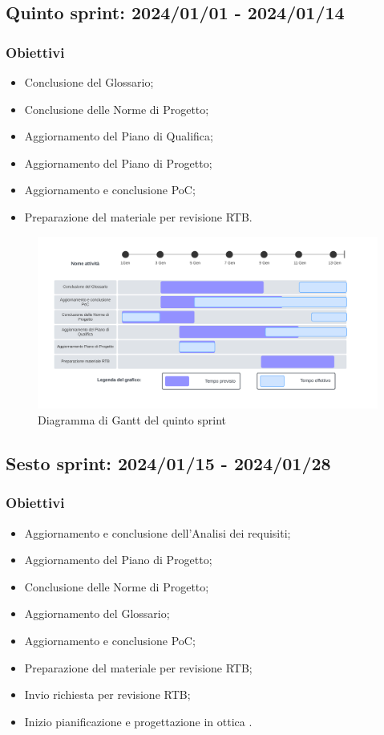\subsection{Quinto sprint: 2024/01/01 - 2024/01/14}
\subsubsection{Obiettivi}
\begin{itemize}
    \item Conclusione del Glossario;
    \item Conclusione delle Norme di Progetto;
    \item Aggiornamento del Piano di Qualifica;
    \item Aggiornamento del Piano di Progetto;
    \item Aggiornamento e conclusione PoC;
    \item Preparazione del materiale per revisione RTB.
\end{itemize}

\begin{figure}[h!]
    \centering  
    \includegraphics[width=\textwidth]{Roadmap5sprint.png}
    \caption{Diagramma di Gantt del quinto sprint}
    \label{fig:roadmap5s}
\end{figure}
\newpage

\subsection{Sesto sprint: 2024/01/15 - 2024/01/28}
\subsubsection{Obiettivi}
\begin{itemize}
    \item Aggiornamento e conclusione dell'Analisi dei requisiti;
    \item Aggiornamento del Piano di Progetto;
    \item Conclusione delle Norme di Progetto;
    \item Aggiornamento del Glossario;
    \item Aggiornamento e conclusione PoC;
    \item Preparazione del materiale per revisione RTB;
    \item Invio richiesta per revisione RTB;
    \item Inizio pianificazione e progettazione in ottica .
\end{itemize}

